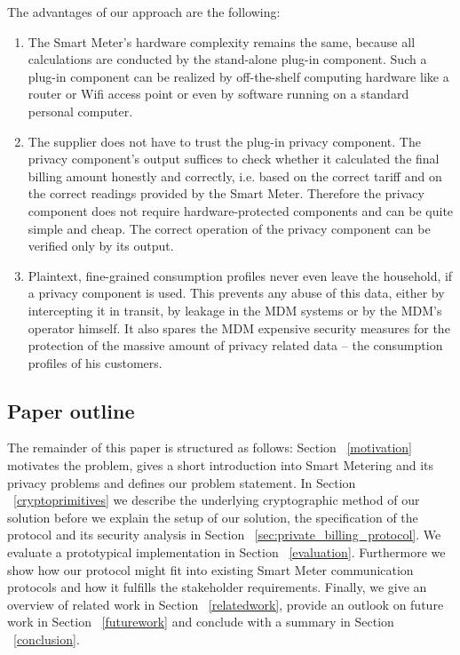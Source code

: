\documentclass[english]{llncs}
\begin{document}
The advantages of our approach are the following:
\begin{enumerate}
\item 
The Smart Meter's hardware complexity remains the same, because all calculations are conducted by the stand-alone plug-in component.
Such a plug-in component can be realized by off-the-shelf computing hardware like a router or Wifi access point or even by software running on a standard personal computer.
\item
The supplier does not have to trust the plug-in privacy component.
The privacy component's output suffices to check whether it calculated the final billing amount honestly and correctly, i.e. based on the correct tariff and on the correct readings provided by the Smart Meter. Therefore the privacy component does not require hardware-protected components and can be quite simple and cheap. 
The correct operation of the privacy component can be verified only by its output.

\item
Plaintext, fine-grained consumption profiles never even leave the household, if a privacy component is used.
This prevents any abuse of this data, either by intercepting it in transit, by leakage in the MDM systems or by the MDM's operator himself.
It also spares the MDM expensive security measures for the protection of the massive amount of privacy related data -- the consumption profiles of his customers.
\end{enumerate}

\subsection{Paper outline}

The remainder of this paper is structured as follows:
Section ~\ref{motivation} motivates the problem, gives a short introduction into Smart Metering and its privacy problems and defines our problem statement.
In Section ~\ref{cryptoprimitives} we describe the underlying cryptographic method of our solution before we explain the setup of our solution, the specification of the protocol and its security analysis in Section ~\ref{sec:private_billing_protocol}.
We evaluate a prototypical implementation in Section ~\ref{evaluation}.
Furthermore we show how our protocol might fit into existing Smart Meter communication protocols and how it fulfills the stakeholder requirements.
Finally, we give an overview of related work in Section ~\ref{relatedwork}, provide an outlook on future work in Section ~\ref{futurework} and conclude with a summary in Section ~\ref{conclusion}. 
\end{document}
